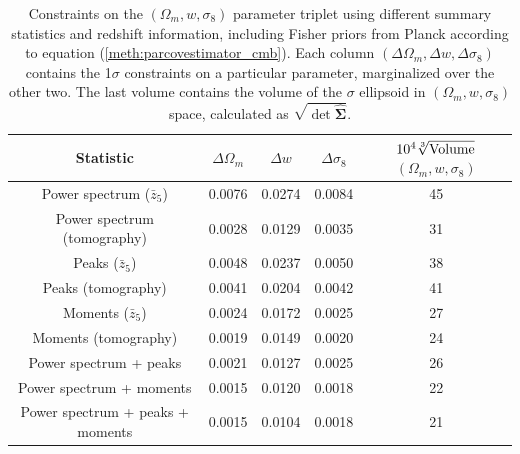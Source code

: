 \documentclass[reprint,aps,prd,superscriptaddress,showkeys,showpacs]{revtex4-1}
\newcommand{\bbh}[1]{\mathbf{\hat{#1}}}
\begin{document}
\begin{table}
\begin{tabular}{c|c|c|c|c|}
\toprule
                        \textbf{Statistic} & $\Delta \Omega_m$ & $\Delta w$ & $\Delta \sigma_8$ & $10^4\sqrt[3]{\rm Volume}$ $(\Omega_m,w,\sigma_8)$ \\ \hline \hline
\midrule
     Power spectrum ($\bar{z}_5$) &            0.0076 &     0.0274 &            0.0084 &                                                 45 \\
      Power spectrum (tomography) &            0.0028 &     0.0129 &            0.0035 &                                                 31 \\
              Peaks ($\bar{z}_5$) &            0.0048 &     0.0237 &            0.0050 &                                                 38 \\
               Peaks (tomography) &            0.0041 &     0.0204 &            0.0042 &                                                 41 \\
            Moments ($\bar{z}_5$) &            0.0024 &     0.0172 &            0.0025 &                                                 27 \\
             Moments (tomography) &            0.0019 &     0.0149 &            0.0020 &                                                 24 \\ \hline \hline
           Power spectrum + peaks &            0.0021 &     0.0127 &            0.0025 &                                                 26 \\ 
         Power spectrum + moments &            0.0015 &     0.0120 &            0.0018 &                                                 22 \\
 Power spectrum + peaks + moments &            0.0015 &     0.0104 &            0.0018 &                                                 21 \\ \hline
\bottomrule
\end{tabular}
\caption{Constraints on the $(\Omega_m,w,\sigma_8)$ parameter triplet using different summary statistics and redshift information, including Fisher priors from Planck according to equation (\ref{meth:parcovestimator_cmb}). Each column $(\Delta \Omega_m,\Delta w,\Delta \sigma_8)$ contains the 1$\sigma$ constraints on a particular parameter, marginalized over the other two. The last volume contains the volume of the $\sigma$ ellipsoid in $(\Omega_m,w,\sigma_8)$ space, calculated as $\sqrt{\det \bbh{\Sigma}}$.}
\label{tbl:constraints-cmb}
\end{table}
\end{document}
